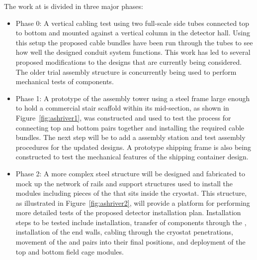 The work at  is divided in three major phases:
\begin{itemize}
  \item {Phase 0:} A vertical cabling test using two full-scale 
          side tubes connected top to bottom and mounted 
         against a vertical column in the detector hall.  Using this 
         setup the proposed cable bundles have been run through the 
         tubes to see how well the designed conduit system functions.
         This work has led to several proposed modifications to the 
         designs that are currently being considered.  The older 
          trial assembly structure is concurrently 
         being used to perform mechanical tests of  
         components. 
  \item {Phase 1:} A prototype of the   
         assembly tower using a steel frame large enough to hold a 
         commercial stair scaffold within its mid-section, as shown 
         in Figure~\ref{fig:ashriver1}, was constructed and %
        used to test the process for connecting top 
         and bottom  pairs together and installing the 
         required cable bundles.  The next step will be to add a
          assembly station and test assembly procedures 
         for the updated  designs.  A prototype 
          shipping frame is also being constructed to 
         test the mechanical features of the shipping container 
         design.  
  \item {Phase 2:} A more complex steel structure will be 
         designed and fabricated to mock up the network of rails 
         and support structures used to install the 
          modules including pieces of the  that 
         sits inside the cryostat.  This structure, as 
         illustrated in Figure~\ref{fig:ashriver2}, will provide 
         a platform for performing more detailed tests of the 
         proposed detector installation plan.  Installation steps 
         to be tested include  installation, transfer 
         of  components through the , 
         installation of the  end walls, cabling 
         through the cryostat penetrations, movement of the 
          and   pairs into their final 
         positions, and deployment of the top and bottom field 
         cage modules.
\end{itemize}

